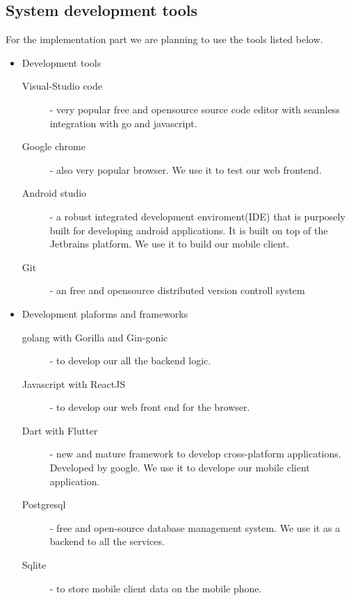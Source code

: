 		\subsection{System development tools}

For the implementation part we are planning to use the tools listed below.
\begin{itemize}
	\item Development tools
	\begin{description}
		\item[Visual-Studio code] - very popular free and opensource source code editor with seamless integration with go and javascript.
		\item[Google chrome] - also very popular browser. We use it to test our web frontend.
		\item[Android studio] - a robust integrated development enviroment(IDE) that is purposely built for developing android applications. It is built on top of the Jetbrains platform. We use it to build our mobile client.
		\item[Git] - an free and opensource distributed version controll system
	\end{description}
	\item Development plaforms and frameworks
	\begin{description}
		\item[golang with Gorilla and Gin-gonic] - to develop our all the backend logic.
		\item[Javascript with ReactJS] - to develop our web front end for the browser.
		\item[Dart with Flutter] - new and mature framework to develop cross-platform applications. Developed by google. We use it to develope our mobile client application.
		\item[Postgresql] - free and open-source database management system. We use it as a backend to all the services.
		\item[Sqlite] - to store mobile client data on the mobile phone.
	\end{description}


\end{itemize}